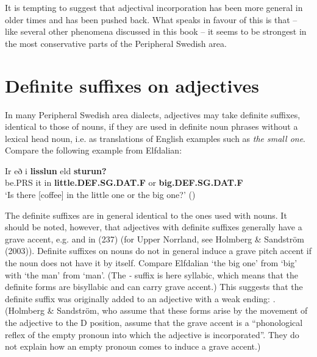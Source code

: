 
It is tempting to suggest that adjectival incorporation has been more general in older times and has been pushed back. What speaks in favour of this is that – like several other phenomena discussed in this book – it seems to be strongest in the most conservative parts of the Peripheral Swedish area. 


\section{Definite suffixes on adjectives}
\label{bkm:Ref155519944}
In many Peripheral Swedish area dialects, adjectives may take definite suffixes, identical to those of nouns, if they are used in definite noun phrases without a lexical head noun, i.e. as translations of English examples such as \textit{the small one}. Compare the following example from Elfdalian:


\ea\label{}
\gll Ir  eð  i  \textbf{lisslun} eld  \textbf{sturun?}\\
be.PRS  it  in  \textbf{little.DEF.SG.DAT.F} or  \textbf{big.DEF.SG.DAT.F}\\
\glt ‘Is there [coffee] in the little one or the big one?’ (\citet[53]{Levander1909})
\z

The definite suffixes are in general identical to the ones used with nouns. It should be noted, however, that adjectives with definite suffixes generally have a grave accent, e.g.  and  in (237) (for Upper Norrland, see Holmberg \& Sandström (2003)). Definite suffixes on nouns do not in general induce a grave pitch accent if the noun does not have it by itself. Compare Elfdalian  ‘the big one’ from  ‘big’ with  ‘the man’ from  ‘man’. (The\textit{ {}-} suffix is here syllabic, which means that the definite forms are bisyllabic and can carry grave accent.) This suggests that the definite suffix was originally added to an adjective with a weak ending: . (Holmberg \& Sandström, who assume that these forms arise by the movement of the adjective to the D position, assume that the grave accent is a “phonological reflex of the empty pronoun into which the adjective is incorporated”. They do not explain how an empty pronoun comes to induce a grave accent.) 

